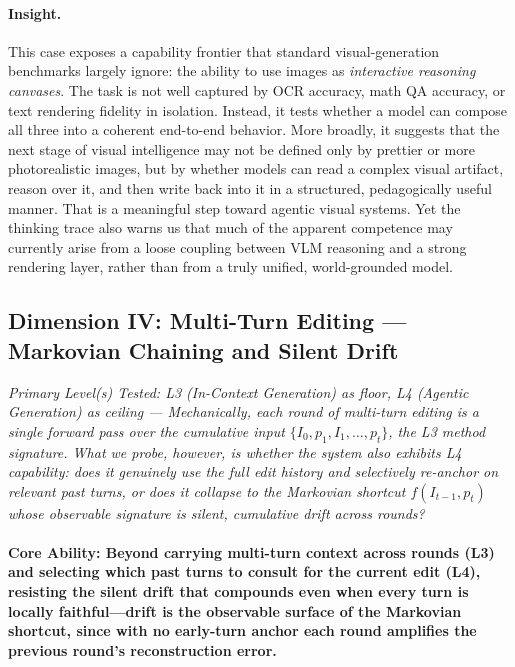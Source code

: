 \paragraph{Insight.}
This case exposes a capability frontier that standard visual-generation benchmarks largely ignore: the ability to use images as \emph{interactive reasoning canvases}. The task is not well captured by OCR accuracy, math QA accuracy, or text rendering fidelity in isolation. Instead, it tests whether a model can compose all three into a coherent end-to-end behavior. More broadly, it suggests that the next stage of visual intelligence may not be defined only by prettier or more photorealistic images, but by whether models can read a complex visual artifact, reason over it, and then write back into it in a structured, pedagogically useful manner. That is a meaningful step toward agentic visual systems. Yet the thinking trace also warns us that much of the apparent competence may currently arise from a loose coupling between VLM reasoning and a strong rendering layer, rather than from a truly unified, world-grounded model.

\subsection{Dimension IV: Multi-Turn Editing --- Markovian Chaining and Silent Drift}

\noindent\textit{Primary Level(s) Tested: L3 (In-Context Generation) as floor, L4 (Agentic Generation) as ceiling --- Mechanically, each round of multi-turn editing is a single forward pass over the cumulative input $\{I_0, p_1, I_1, \ldots, p_t\}$, the L3 method signature. What we probe, however, is whether the system also exhibits L4 capability: does it genuinely use the full edit history and selectively re-anchor on relevant past turns, or does it collapse to the Markovian shortcut $f(I_{t-1}, p_t)$ whose observable signature is silent, cumulative drift across rounds?}

\paragraph{Core Ability: Beyond carrying multi-turn context across rounds (L3) and selecting which past turns to consult for the current edit (L4), resisting the silent drift that compounds even when every turn is locally faithful---drift is the observable surface of the Markovian shortcut, since with no early-turn anchor each round amplifies the previous round's reconstruction error.}


